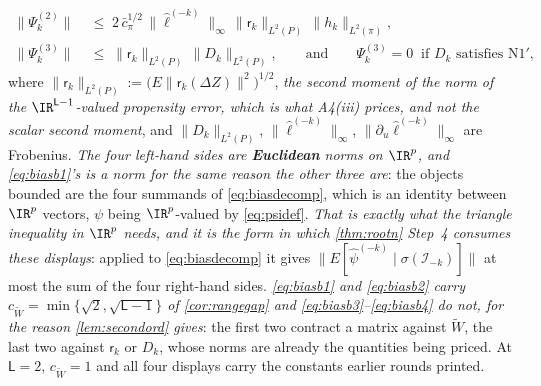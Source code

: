 \begin{lemma}
\begin{align}
\label{eq:biasb2}\\
\big\|\Psi^{(2)}_k\big\|&\;\le\;2\,\bar c_\pi^{1/2}\,\big\|\hat\ell^{(-k)}\big\|_\infty\,\big\|\mathsf r_k\big\|_{L^{2}(P)}\,\big\|h_k\big\|_{L^{2}(\pi)},
\label{eq:biasb3}\\
\big\|\Psi^{(3)}_k\big\|&\;\le\;\big\|\mathsf r_k\big\|_{L^{2}(P)}\,\big\|D_k\big\|_{L^{2}(P)},
\qquad\text{and}\qquad \Psi^{(3)}_k=0\ \text{ if $D_k$ satisfies N1}',
\label{eq:biasb4}
\end{align}
where $\|\mathsf r_k\|_{L^{2}(P)}:=\big(E\|\mathsf r_k(\Delta Z)\|^{2}\big)^{1/2}$, \emph{the second
moment of the norm of the $\IR^{\mathsf L-1}$-valued propensity error, which is what A4(iii) prices, and
not the scalar second moment}, and $\|D_k\|_{L^{2}(P)}$, $\|\hat\ell^{(-k)}\|_\infty$,
$\|\partial_u\hat\ell^{(-k)}\|_\infty$ are Frobenius.
\emph{The four left-hand sides are \textbf{Euclidean} norms on $\IR^{p}$, and \eqref{eq:biasb1}'s is a
norm for the same reason the other three are}: the objects bounded are the four summands of
\eqref{eq:biasdecomp}, which is an identity between $\IR^{p}$ vectors, $\psi$ being $\IR^{p}$-valued by
\eqref{eq:psidef}. \emph{That is exactly what the triangle inequality in $\IR^{p}$ needs, and it is the
form in which \cref{thm:rootn} Step~4 consumes these displays}: applied to \eqref{eq:biasdecomp} it gives
$\|E[\hat\psi^{(-k)}\mid\sigma(\mathcal I_{-k})]\|$ at most the sum of the four right-hand sides.
\emph{\eqref{eq:biasb1} and \eqref{eq:biasb2} carry
$c_{\widetilde W}=\min\{\sqrt2,\sqrt{\mathsf L-1}\}$ of \cref{cor:rangegap} and
\eqref{eq:biasb3}--\eqref{eq:biasb4} do not, for the reason \cref{lem:secondord} gives}: the first two
contract a matrix against $\widetilde W$, the last two against $\mathsf r_k$ or $D_k$, whose norms are
already the quantities being priced. At $\mathsf L=2$, $c_{\widetilde W}=1$ and all four
displays carry the constants earlier rounds printed.


\end{lemma}
